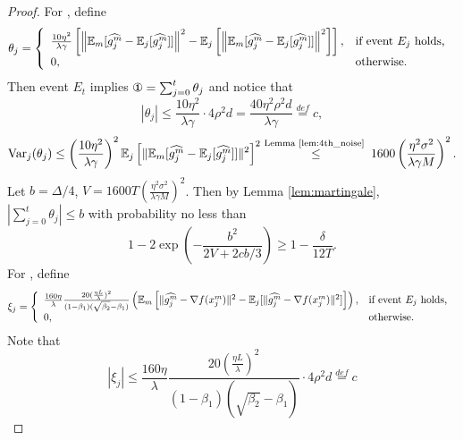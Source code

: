 \documentclass{article} %
\numberwithin{equation}{section}
\newcommand{\cirone}{\text{\ding{172}}}
\newcommand{\cirthree}{\text{\ding{174}}}
\begin{document}
\begin{proof}
    For \cirone, define 
    \begin{equation}
        \theta_j=\left\{
            \begin{array}{ll}
                \frac{10\eta^2}{\lambda\gamma}\left[\left\|\mathbb{E}_m[\widehat{g_j^m}-\mathbb{E}_j[\widehat{g_j^m}]]\right\|^2-\mathbb{E}_j\left[\left\|\mathbb{E}_m[\widehat{g_j^m}-\mathbb{E}_j[\widehat{g_j^m}]]\right\|^2\right]\right], & \text{if event $E_j$ holds, } \\
                0 ,& \text{otherwise.}
            \end{array}
        \right.
    \end{equation}
    Then event $E_t$ implies $\cirone=\sum_{j=0}^t\theta_j$ and notice that
    \begin{equation}
        |\theta_j|\leq \frac{10\eta^2}{\lambda\gamma}\cdot 4\rho^2d=\frac{40\eta^2\rho^2d}{\lambda\gamma}\overset{def}{=}c,
    \end{equation}
    \begin{equation}
        \mathrm{Var}_j(\theta_j) 
        \leq \left(\frac{10\eta^2}{\lambda\gamma}\right)^2 \mathbb{E}_j\left[\|\mathbb{E}_m[\widehat{g_j^m}-\mathbb{E}_j[\widehat{g_j^m}]]\|^2\right]^2 \overset{\text{Lemma \ref{lem:4th_noise}
        } }{\leq} 1600\left(\frac{\eta^2\sigma^2}{\lambda\gamma M}\right)^2.
    \end{equation}
    Let $b=\Delta/4$, $V=1600T\left(\frac{\eta^2\sigma^2}{\lambda\gamma M}\right)^2$. Then by Lemma \ref{lem:martingale}, $|\sum_{j=0}^t\theta_j|\leq b$ with probability no less than
    \begin{equation}
        1 - 2\exp{\left(-\frac{b^2}{2V+2cb/3}\right)} \geq 1-\frac{\delta}{12T}.
    \end{equation}
    For \cirthree, define
    \begin{equation}
        \xi_j=\left\{
            \begin{array}{ll}
                \frac{160\eta}{\lambda}\frac{20(\frac{\eta L}{\lambda})^2}{(1-\beta_1)(\sqrt{\beta_2}-\beta_1)}\left(\mathbb{E}_m\left[\|\widehat{g_j^m}-\nabla f(x_j^m)\|^2-\mathbb{E}_j[\|\widehat{g_j^m}-\nabla f(x_j^m)\|^2]\right]\right), & \text{if event $E_j$ holds, } \\
                0 ,& \text{otherwise.}
            \end{array}
        \right.        
    \end{equation}
    Note that
    \begin{equation}
        |\xi_j|\leq \frac{160\eta}{\lambda}\frac{20(\frac{\eta L}{\lambda})^2}{(1-\beta_1)(\sqrt{\beta_2}-\beta_1)}\cdot 4\rho^2d\overset{def}{=}c

\end{equation}
\end{proof}
\end{document}
